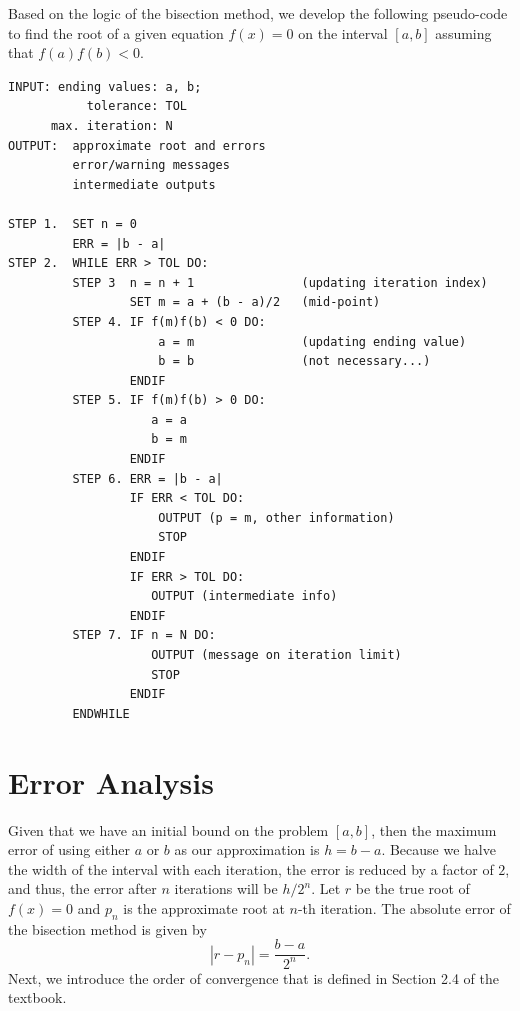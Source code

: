 \documentclass[
]{book}
\begin{document}
Based on the logic of the bisection method, we develop the following pseudo-code to find the root of a given equation \(f(x) = 0\) on the interval \([a, b]\) assuming that \(f(a)f(b) < 0\).

\begin{verbatim}
INPUT: ending values: a, b;
           tolerance: TOL
      max. iteration: N
OUTPUT:  approximate root and errors
         error/warning messages
         intermediate outputs

STEP 1.  SET n = 0
         ERR = |b - a|
STEP 2.  WHILE ERR > TOL DO:
         STEP 3  n = n + 1               (updating iteration index)
                 SET m = a + (b - a)/2   (mid-point)
         STEP 4. IF f(m)f(b) < 0 DO:
                     a = m               (updating ending value)
                     b = b               (not necessary...)
                 ENDIF
         STEP 5. IF f(m)f(b) > 0 DO:
                    a = a
                    b = m
                 ENDIF
         STEP 6. ERR = |b - a|
                 IF ERR < TOL DO:
                     OUTPUT (p = m, other information)
                     STOP
                 ENDIF
                 IF ERR > TOL DO:
                    OUTPUT (intermediate info)
                 ENDIF
         STEP 7. IF n = N DO:
                    OUTPUT (message on iteration limit)
                    STOP
                 ENDIF
         ENDWHILE
\end{verbatim}

\hypertarget{error-analysis-1}{%
\section{Error Analysis}\label{error-analysis-1}}

Given that we have an initial bound on the problem \([a, b]\), then the maximum error of using either \(a\) or \(b\) as our approximation is \(h = b - a\). Because we halve the width of the interval with each iteration, the error is reduced by a factor of \(2\), and thus, the error after \(n\) iterations will be \(h/2^n\). Let \(r\) be the true root of \(f(x) = 0\) and \(p_n\) is the approximate root at \(n\)-th iteration. The absolute error of the bisection method is given by
\[
|r - p_n| = \frac{b - a}{2^n}.
\]
Next, we introduce the order of convergence that is defined in Section 2.4 of the textbook.

\hfill\break
\end{document}
